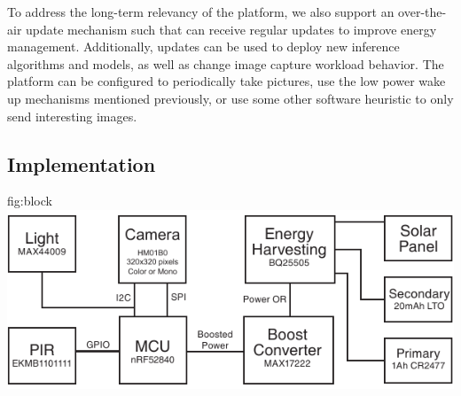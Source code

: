 To address the long-term relevancy of the platform, we also support an over-the-air update mechanism such that \namec can receive regular updates to improve energy management. Additionally, updates can be used to deploy new inference algorithms and models, as well as change image capture workload behavior. The platform can be configured to periodically take pictures, use the low power wake up mechanisms mentioned previously, or use some other software heuristic to only send interesting images.

\subsection{\namec Implementation}
\begin{definefigure}{fig:block}
\includegraphics[width=\columnwidth]{figs/permacam/figs/block_diagram.pdf}
\caption{\name system block diagram.
The system is based on the Himax HM01B0 camera and the Nordic NRF52840 MCU. We include a light and PIR sensor to provide a low power wake up mechanism to drive image capture. A hierarchical energy harvesting system with a rechargeable and non-rechargeable battery are utilized to provide a long, reliable lifetime to the system.
}
\end{definefigure}

